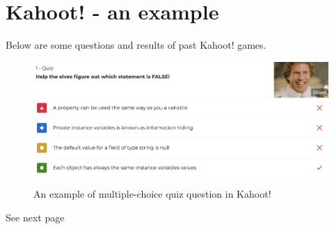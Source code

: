 \chapter{Kahoot! - an example}\label{appendices:kahoot}
Below are some questions and results of past Kahoot! games.
\begin{figure}[h]
    \centering
   \includegraphics[width=\textwidth]{appendices/kahoot/kahoot.png}
    \label{fig:hboi_model}
    \caption{An example of multiple-choice quiz question in Kahoot!}
\end{figure}

\noindent
\begin{minipage}{0.5\textwidth}
\begin{flushleft}
\end{flushleft}
\end{minipage}
\hfill
\begin{minipage}{0.5\textwidth}
\begin{flushright}
   See next page
\end{flushright}
\end{minipage}


